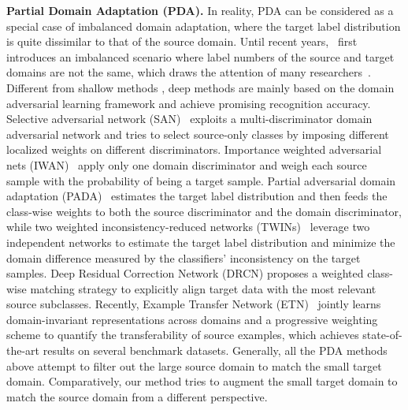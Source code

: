 \documentclass[runningheads]{llncs}
\begin{document}
\textbf{Partial Domain Adaptation (PDA).}
In reality, PDA can be considered as a special case of imbalanced domain adaptation, where the target label distribution is quite dissimilar to that of the source domain.
Until recent years,~\cite{ming2015unsupervised} first introduces an imbalanced scenario where label numbers of the source and target domains are not the same, which draws the attention of many researchers~\cite{tsai2016domain,cao2018partialb,cao2018partial,zhang2018importance,matsuura2018twins,cao2019learning,hu2019multi}.
Different from shallow methods \cite{ming2015unsupervised,tsai2016domain}, deep methods \cite{cao2018partialb,cao2018partial,zhang2018importance,matsuura2018twins} are mainly based on the domain adversarial learning framework and achieve promising recognition accuracy.
Selective adversarial network (SAN)~\cite{cao2018partialb} exploits a multi-discriminator domain adversarial network and tries to select source-only classes by imposing different localized weights on different discriminators.
Importance weighted adversarial nets (IWAN)~\cite{zhang2018importance} apply only one domain discriminator and weigh each source sample with the probability of being a target sample.
Partial adversarial domain adaptation (PADA)~\cite{cao2018partial} estimates the target label distribution and then feeds the class-wise weights to both the source discriminator and the domain discriminator, while two weighted inconsistency-reduced networks (TWINs)~\cite{matsuura2018twins} leverage two independent networks to estimate the target label distribution and minimize the domain difference measured by the classifiers' inconsistency on the target samples. 
Deep Residual Correction Network (DRCN) \cite{li2020deep} proposes a weighted class-wise matching strategy to explicitly align target data with the most relevant source subclasses.
Recently, Example Transfer Network (ETN)~\cite{cao2019learning} jointly learns domain-invariant representations across domains and a progressive weighting scheme to quantify the transferability of source examples, which achieves state-of-the-art results on several benchmark datasets.
Generally, all the PDA methods above attempt to filter out the large source domain to match the small target domain. Comparatively, our method tries to augment the small target domain to match the source domain from a different perspective.
\end{document}
